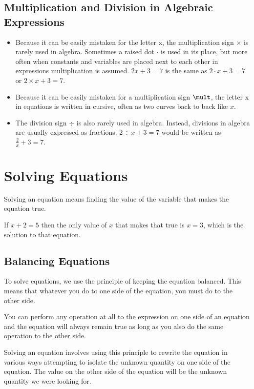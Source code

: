 \documentclass[12pt]{article}
\begin{document}
\subsection*{Multiplication and Division in Algebraic Expressions}
\begin{itemize}
    \item Because it can be easily mistaken for the letter x, the multiplication sign $\times$ is rarely used in algebra. Sometimes a raised dot $\cdot$ is used in its place, but more often when constants and variables are placed next to each other in expressions multiplication is assumed. \( 2x + 3 = 7 \) is the same as \( 2 \cdot x + 3 = 7 \) or \( 2 \times x + 3 = 7 \).
    \item Because it can be easily mistaken for a multiplication sign $\mult$, the letter x in equations is written in cursive, often as two curves back to back like $x$.
    \item The division sign $\div$ is also rarely used in algebra. Instead, divisions in algebra are usually expressed as fractions. \( 2 \div x + 3 = 7 \) would be written as \( \frac{2}{x} + 3 = 7 \).
\end{itemize}

\newpage

\section*{Solving Equations}

Solving an equation means finding the value of the variable that makes the equation true.

If $x+2=5$ then the only value of $x$ that makes that true is $x=3$, which is the solution to that equation.

\subsection*{Balancing Equations}

To solve equations, we use the principle of keeping the equation balanced. This means that whatever you do to one side of the equation, you must do to the other side.

You can perform any operation at all to the expression on one side of an equation and the equation will always remain true as long as you also do the same operation to the other side.

Solving an equation involves using this principle to rewrite the equation in various ways attempting to isolate the unknown quantity on one side of the equation. The value on the other side of the equation will be the unknown quantity we were looking for.
\end{document}
